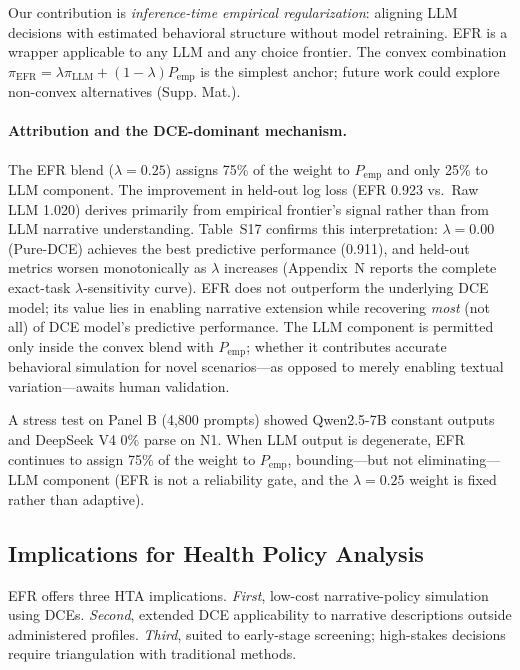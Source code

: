 \documentclass[12pt]{article}
\begin{document}
Our contribution is \emph{inference-time empirical regularization}: aligning LLM decisions with estimated behavioral structure without model retraining. EFR is a wrapper applicable to any LLM and any choice frontier. The convex combination $\pi_{\mathrm{EFR}} = \lambda \pi_{\mathrm{LLM}} + (1-\lambda) P_{\mathrm{emp}}$ is the simplest anchor; future work could explore non-convex alternatives (Supp. Mat.).

\paragraph*{Attribution and the DCE-dominant mechanism.} The EFR blend ($\lambda = 0.25$) assigns 75\% of the weight to $P_{\mathrm{emp}}$ and only 25\% to LLM component. The improvement in held-out log loss (EFR 0.923 vs.\ Raw LLM 1.020) derives primarily from empirical frontier's signal rather than from LLM narrative understanding. Table~S17 confirms this interpretation: $\lambda = 0.00$ (Pure-DCE) achieves the best predictive performance (0.911), and held-out metrics worsen monotonically as $\lambda$ increases (Appendix~N reports the complete exact-task $\lambda$-sensitivity curve). EFR does not outperform the underlying DCE model; its value lies in enabling narrative extension while recovering \emph{most} (not all) of DCE model's predictive performance. The LLM component is permitted only inside the convex blend with $P_{\mathrm{emp}}$; whether it contributes accurate behavioral simulation for novel scenarios---as opposed to merely enabling textual variation---awaits human validation.

A stress test on Panel B (4,800 prompts) showed Qwen2.5-7B constant outputs and DeepSeek V4 0\% parse on N1. When LLM output is degenerate, EFR continues to assign 75\% of the weight to $P_{\text{emp}}$, bounding---but not eliminating---LLM component (EFR is not a reliability gate, and the $\lambda=0.25$ weight is fixed rather than adaptive).

\subsection{Implications for Health Policy Analysis}
\label{sec:impl_policy}

EFR offers three HTA implications. \emph{First}, low-cost narrative-policy simulation using DCEs. \emph{Second}, extended DCE applicability to narrative descriptions outside administered profiles. \emph{Third}, suited to early-stage screening; high-stakes decisions require triangulation with traditional methods.
\end{document}
